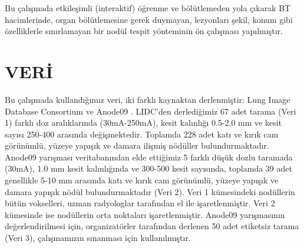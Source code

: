 \documentclass[conference]{IEEEtran}
\begin{document}
Bu çalışmada etkileşimli (interaktif) öğrenme ve bölütlemeden yola çıkarak BT hacimlerinde, organ bölütlemesine gerek duymayan, lezyonları şekil, konum gibi özelliklerle sınırlamayan bir nodül tespit yönteminin ön çalışması yapılmıştır. 



\section{VERİ}\label{veriler}
Bu çalışmada kullandığımız veri, iki farklı kaynaktan derlenmiştir: Lung Image Database Consortium \cite{lidc2011} ve Anode09 \cite{anode09}. LIDC'den derlediğimiz 67 adet tarama (Veri 1) farklı doz aralıklarında (30mA-250mA), kesit kalınlığı 0.5-2.0 mm ve kesit sayısı 250-400 arasında değişmektedir. Toplamda 228 adet katı ve kırık cam görünümlü, yüzeye yapışık ve damara ilişmiş nödüller bulundurmaktadır. Anode09 yarışması veritabanından elde ettiğimiz 5 farklı düşük dozlu taramada (30mA), 1.0 mm kesit kalınlığında ve 300-500 kesit sayısında, toplamda 39 adet genellikle 5-10 mm arasında katı ve kırık cam görünümlü, yüzeye yapışık ve damara yapışık nödül bulundurmaktadır (Veri 2). Veri 1 kümesindeki nodüllerin bütün vokselleri, uzman radyologlar tarafından el ile işaretlenmiştir. Veri 2 kümesinde ise nodüllerin orta noktaları işaretlenmiştir. Anode09 yarışmasının değerlendirilmesi için, organizatörler tarafından derlenen 50 adet etiketsiz tarama (Veri 3), çalışmamızın sınanması için kullanılmıştır.
\end{document}
